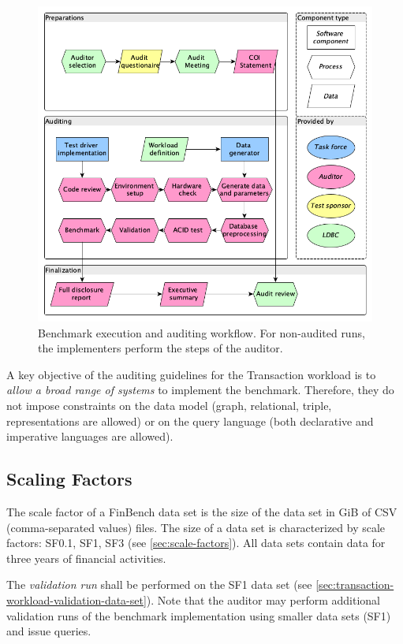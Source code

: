 \begin{figure}[h]
    \centering
    \includegraphics[scale=\yedscale]{figures/audit-workflow}
    \caption{Benchmark execution and auditing workflow. For non-audited runs, the implementers perform the steps of the auditor.}
    \label{fig:audit-workflow}
\end{figure}

A key objective of the auditing guidelines for the Transaction workload is to \emph{allow a broad range of systems} to implement the benchmark.
Therefore, they do not impose constraints on the data model
(graph, relational, triple, \etc representations are allowed)
or on the query language
(both declarative and imperative languages are allowed).

\subsection{Scaling Factors}
\label{sec:transaction-workload-scaling}

The scale factor of a FinBench data set is the size of the data set in GiB of CSV (comma-separated values) files.
The size of a data set is characterized by scale factors: SF0.1, SF1, SF3 \etc (see \autoref{sec:scale-factors}).
All data sets contain data for three years of financial activities.

The \emph{validation run} shall be performed on the SF1 data set (see \autoref{sec:transaction-workload-validation-data-set}). Note that the auditor may perform additional validation runs of the benchmark implementation using smaller data sets (\eg SF1) and issue queries.

